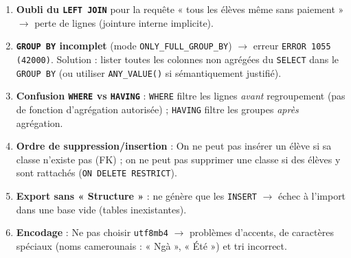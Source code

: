 \documentclass[11pt]{article}
\begin{document}
\begin{attention}
\begin{enumerate}
    \item \textbf{Oubli du \texttt{LEFT JOIN}} pour la requête « tous les élèves même sans paiement » $\to$ perte de lignes (jointure interne implicite).
    \item \textbf{\texttt{GROUP BY} incomplet} (mode \texttt{ONLY\_FULL\_GROUP\_BY}) $\to$ erreur \texttt{ERROR 1055 (42000)}. Solution : lister toutes les colonnes non agrégées du \texttt{SELECT} dans le \texttt{GROUP BY} (ou utiliser \texttt{ANY\_VALUE()} si sémantiquement justifié).
    \item \textbf{Confusion \texttt{WHERE} vs \texttt{HAVING}} : \texttt{WHERE} filtre les lignes \emph{avant} regroupement (pas de fonction d'agrégation autorisée) ; \texttt{HAVING} filtre les groupes \emph{après} agrégation.
    \item \textbf{Ordre de suppression/insertion} : On ne peut pas insérer un élève si sa classe n'existe pas (FK) ; on ne peut pas supprimer une classe si des élèves y sont rattachés (\texttt{ON DELETE RESTRICT}).
    \item \textbf{Export sans « Structure »} : ne génère que les \texttt{INSERT} $\to$ échec à l'import dans une base vide (tables inexistantes).
    \item \textbf{Encodage} : Ne pas choisir \texttt{utf8mb4} $\to$ problèmes d'accents, de caractères spéciaux (noms camerounais : « Ngà », « Été ») et tri incorrect.
\end{enumerate}
\end{attention}
\end{document}
